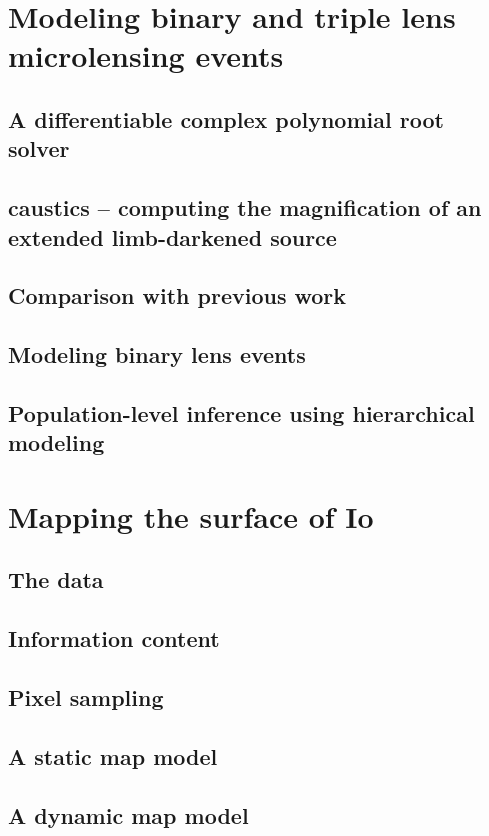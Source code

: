 \documentclass[12pt,dvipsnames]{report}
\begin{document}
\chapter{Modeling binary and triple lens microlensing events}
\label{ch:microlensing2}
\section{A differentiable complex polynomial root solver}
\section{\textsf{caustics} -- computing the magnification of an extended limb-darkened source}
\section{Comparison with previous work}
\section{Modeling binary lens events}
\section{Population-level inference using hierarchical modeling}


\chapter{Mapping the surface of Io}
\label{ch:mapping_io}
\section{The data}
\section{Information content}
\section{Pixel sampling}
\section{A static map model}
\section{A dynamic map model}
\end{document}

